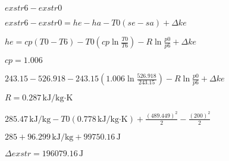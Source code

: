 \( exstr6 - exstr0 \)  

\( exstr6 - exstr0 = he - ha - T0 (se - sa) + \Delta ke \)  

\( he = cp (T0 - T6) - T0 (cp \ln \frac{T0}{T6}) - R \ln \frac{p0}{p6} + \Delta ke \)  

\( cp = 1.006 \)  

\( 243.15 - 526.918 - 243.15 (1.006 \ln \frac{526.918}{243.15}) - R \ln \frac{p0}{p6} + \Delta ke \)  

\( R = 0.287 \, \text{kJ/kg·K} \)  

\( 285.47 \, \text{kJ/kg} - T0 (0.778 \, \text{kJ/kg·K}) + \frac{(489.449)^2}{2} - \frac{(200)^2}{2} \)  

\( 285 + 96.299 \, \text{kJ/kg} + 99750.16 \, \text{J} \)  

\( \Delta exstr = 196079.16 \, \text{J} \)